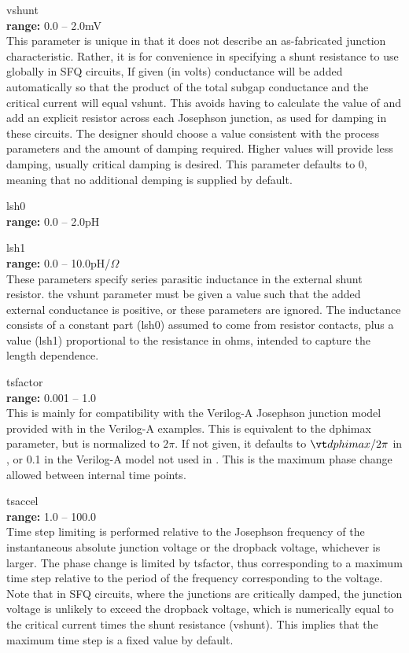 \begin{description}
\item{\vt vshunt}\\
{\bf range:} 0.0 -- 2.0mV\\
This parameter is unique in that it does not describe an as-fabricated
junction characteristic.  Rather, it is for convenience in specifying
a shunt resistance to use globally in SFQ circuits, If given (in
volts) conductance will be added automatically so that the product of
the total subgap conductance and the critical current will equal {\vt
vshunt}.  This avoids having to calculate the value of and add an
explicit resistor across each Josephson junction, as used for damping
in these circuits.  The designer should choose a value consistent with
the process parameters and the amount of damping required.  Higher
values will provide less damping, usually critical damping is desired. 
This parameter defaults to 0, meaning that no additional demping is
supplied by default.

\item{\vt lsh0}\\
{\bf range:} 0.0 -- 2.0pH
\item{\vt lsh1}\\
{\bf range:} 0.0 -- 10.0pH/${\Omega}$\\
These parameters specify series parasitic inductance in the external
shunt resistor.  the {\vt vshunt} parameter must be given a value such
that the added external conductance is positive, or these parameters
are ignored.  The inductance consists of a constant part ({\vt lsh0})
assumed to come from resistor contacts, plus a value ({\vt lsh1})
proportional to the resistance in ohms, intended to capture the length
dependence.

\item{\vt tsfactor}\\
{\bf range:} 0.001 -- 1.0\\
This is mainly for compatibility with the Verilog-A Josephson junction
model provided with {\WRspice} in the Verilog-A examples.  This is
equivalent to the {\WRspice} {\vt dphimax} parameter, but is
normalized to $2\pi$.  If not given, it defaults to ${\vt dphimax}/2\pi$
in {\WRspice}, or 0.1 in the Verilog-A model not used in {\WRspice}. 
This is the maximum phase change allowed between internal time points. 

\item{\vt tsaccel}\\
{\bf range:} 1.0 -- 100.0\\
Time step limiting is performed relative to the Josephson frequency of
the instantaneous absolute junction voltage or the dropback voltage,
whichever is larger.  The phase change is limited by {\vt tsfactor},
thus corresponding to a maximum time step relative to the period of
the frequency corresponding to the voltage.  Note that in SFQ
circuits, where the junctions are critically damped, the junction
voltage is unlikely to exceed the dropback voltage, which is
numerically equal to the critical current times the shunt resistance
({\vt vshunt}).  This implies that the maximum time step is a fixed
value by default.


\end{description}

